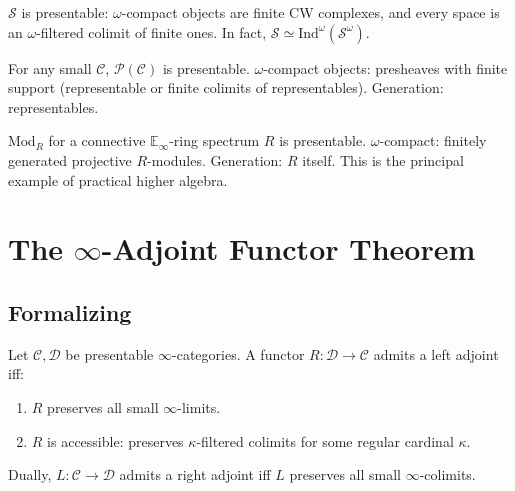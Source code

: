 \begin{example_thm}
\label{ex:S-presentable}
$\mathcal{S}$ is presentable: $\omega$-compact objects are finite CW
complexes, and every space is an $\omega$-filtered colimit of finite ones.
In fact, $\mathcal{S} \simeq \mathrm{Ind}^\omega(\mathcal{S}^\omega)$.
\end{example_thm}

\begin{example_thm}
\label{ex:PC-presentable}
For any small $\mathcal{C}$, $\mathcal{P}(\mathcal{C})$ is presentable.
$\omega$-compact objects: presheaves with finite support (representable
or finite colimits of representables). Generation: representables.
\end{example_thm}

\begin{example_thm}
\label{ex:modules}
$\mathrm{Mod}_R$ for a connective $\mathbb{E}_\infty$-ring spectrum $R$
is presentable. $\omega$-compact: finitely generated projective
$R$-modules. Generation: $R$ itself. This is the principal example of
practical higher algebra.
\end{example_thm}


\section{The $\infty$-Adjoint Functor Theorem}
\label{sec:aft}

\subsection{Formalizing}

\begin{theorem}
\label{thm:aft-full}
Let $\mathcal{C}, \mathcal{D}$ be presentable $\infty$-categories. A
functor $R : \mathcal{D} \to \mathcal{C}$ admits a left adjoint iff:
\begin{enumerate}
  \item $R$ preserves all small $\infty$-limits.
  \item $R$ is accessible: preserves $\kappa$-filtered colimits for some
        regular cardinal $\kappa$.
\end{enumerate}
Dually, $L : \mathcal{C} \to \mathcal{D}$ admits a right adjoint iff $L$
preserves all small $\infty$-colimits.
\end{theorem}

